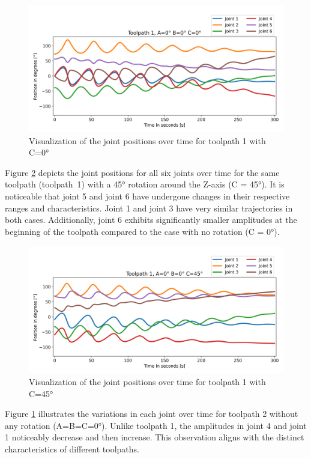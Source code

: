\begin{figure}[H]
	\centerline{\includegraphics[width=1\textwidth]{figures/TP1ABC0.png}}
	\caption{Visualization of the joint positions over time for toolpath 1 with C=0°}
	\label{TP1ABC0}
\end{figure}
\newpage
Figure \ref{TP1ABC45} depicts the joint positions for all six joints over time for the same toolpath (toolpath~1) with a 45° rotation around the Z-axis (C = 45°).  It is noticeable that joint 5 and joint 6 have undergone changes in their respective ranges and characteristics. Joint 1 and joint 3 have very similar trajectories in both cases. Additionally, joint 6 exhibits significantly smaller amplitudes at the beginning of the toolpath compared to the case with no rotation (C = 0°).

\begin{figure}[H]
	\centerline{\includegraphics[width=1\textwidth]{figures/TP1ABC45.png}}
	\caption{Visualization of the joint positions over time for toolpath 1 with C=45°}
	\label{TP1ABC45}
\end{figure}



Figure \ref{TP1ABC0} illustrates the variations in each joint over time for toolpath 2 without any rotation (A=B=C=0°). Unlike toolpath 1, the amplitudes in joint 4 and joint 1 noticeably decrease and then increase. This observation aligns with the distinct characteristics of different toolpaths.
 
